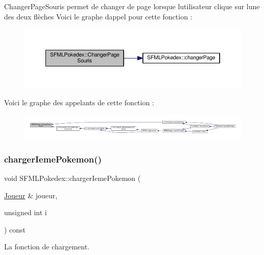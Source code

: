 Changer\+Page\+Souris permet de changer de page lorsque l\textquotesingle{}utilisateur clique sur l\textquotesingle{}une des deux flèches Voici le graphe d\textquotesingle{}appel pour cette fonction \+:\nopagebreak
\begin{figure}[H]
\begin{center}
\leavevmode
\includegraphics[width=350pt]{class_s_f_m_l_pokedex_a9528e644324e4b4c6f0b0a3e7fcdde79_cgraph}
\end{center}
\end{figure}
Voici le graphe des appelants de cette fonction \+:\nopagebreak
\begin{figure}[H]
\begin{center}
\leavevmode
\includegraphics[width=350pt]{class_s_f_m_l_pokedex_a9528e644324e4b4c6f0b0a3e7fcdde79_icgraph}
\end{center}
\end{figure}
\mbox{\label{class_s_f_m_l_pokedex_af47eb49ddd0c3651f390b45b6697c2d2}} 
\subsubsection{\texorpdfstring{charger\+Ieme\+Pokemon()}{chargerIemePokemon()}}
{\footnotesize\ttfamily void S\+F\+M\+L\+Pokedex\+::charger\+Ieme\+Pokemon (\begin{DoxyParamCaption}\item[{\hyperlink{class_joueur}{Joueur} \&}]{joueur,  }\item[{unsigned int}]{i }\end{DoxyParamCaption}) const}



La fonction de chargement. 

